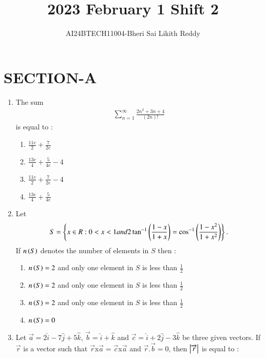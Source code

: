 \documentclass[journal]{IEEEtran}
\begin{document}

\onecolumn
\newpage
\title{2023 February 1 Shift 2}
\author{AI24BTECH11004-Bheri Sai Likith Reddy}
\maketitle
\section{SECTION-A}
\begin{enumerate}
       \item The sum 
            \begin{align*}
	       \sum_{n=1}^\infty \frac{2n^2+3n+4}{(2n)!}
            \end{align*}
	is equal to :
	       \begin{enumerate}
		       \item $\frac{11e}{2}+\frac{7}{2e}$
		       \item $\frac{13e}{4}+\frac{5}{4e}-4$
		       \item $\frac{11e}{2}+\frac{7}{2e}-4$
		       \item $\frac{13e}{4}+\frac{5}{4e}$
        	\end{enumerate}	
	\item Let 
             \begin{align*}  
		S=\left\{x\in R: 0<x<1 and 2\tan ^{-1}\left(\frac{1-x}{1+x}\right)=\cos ^{-1}\left(\frac{1-x^2}{1+x^2}\right)\right\}.
              \end{align*}
	 If $n\left(S\right)$ denotes the number of elements in $S$ then :
               \begin{enumerate}
			       \item $n\left(S\right)=2$ and only one element in $S$ is less than $\frac{1}{2}$
                                \item $n\left(S\right)=2$ and only one element in $S$ is less than $\frac{1}{2}$
				\item $n\left(S\right)=2$ and only one element in $S$ is less than $\frac{1}{2}$ 
                                \item $n\left(S\right)=0$
	       \end{enumerate}	
       \item Let $\overrightarrow{a}=2\hat{i}-7\hat{j}+5\hat{k}$, $\overrightarrow{b}=\hat{i}+\hat{k}$ and $\overrightarrow{c}=\hat{i}+2\hat{j}-3\hat{k}$ be three given vectors. If $\overrightarrow{r}$ is a vector such that $\overrightarrow{r}$x$\overrightarrow{a}=\overrightarrow{c}$x$\overrightarrow{a}$ and $\overrightarrow{r}.\overrightarrow{b}=0$, then $\left\vert\overrightarrow{r}\right\vert$ is equal to :

\end{enumerate}
\end{document}

